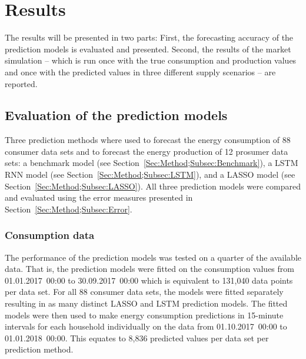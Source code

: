 
\section{Results}\label{Sec:Results}

The results will be presented in two parts: First, the forecasting accuracy of the prediction models is evaluated and presented. Second, the results of the market simulation -- which is run once with the true consumption and production values and once with the predicted values in three different supply scenarios -- are reported.



\subsection{Evaluation of the prediction models}\label{Sec:Results;Subsec:Forecast}

Three prediction methods where used to forecast the energy consumption of 88 consumer data sets and to forecast the energy production of 12 prosumer data sets: a benchmark model (see Section~\ref{Sec:Method;Subsec:Benchmark}), a LSTM RNN model (see Section~\ref{Sec:Method;Subsec:LSTM}), and a LASSO model (see Section~\ref{Sec:Method;Subsec:LASSO}). All three prediction models were compared and evaluated using the error measures presented in Section~\ref{Sec:Method;Subsec:Error}.


\subsubsection{Consumption data}

The performance of the prediction models was tested on a quarter of the available data. That is, the prediction models were fitted on the consumption values from 01.01.2017~00:00 to 30.09.2017~00:00 which is equivalent to 131,040 data points per data set. For all 88 consumer data sets, the models were fitted separately resulting in as many distinct LASSO and LSTM prediction models. The fitted models were then used to make energy consumption predictions in 15-minute intervals for each household individually on the data from 01.10.2017~00:00 to 01.01.2018~00:00. This equates to 8,836 predicted values per data set per prediction method.

